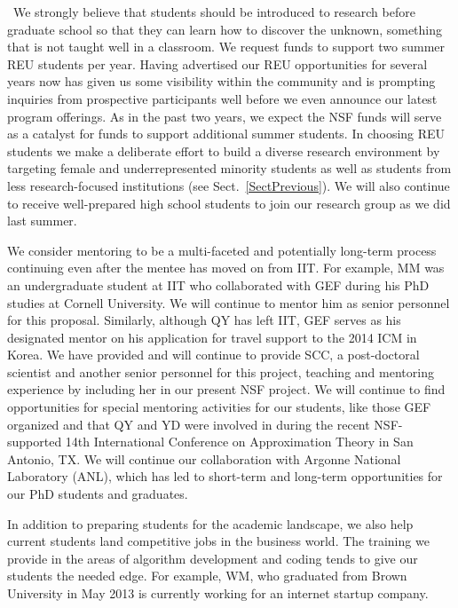\documentclass[11pt]{NSFamsart}
\begin{document}
\begin{description}[leftmargin=2.5ex]
\item[Providing Research Experiences for Undergraduates and High School Students]\ We \linebreak[4] strongly believe that students should be introduced to research before graduate school so that they can learn how to discover the unknown, something that is not taught well in a classroom. We request funds to support two summer REU students per year. Having advertised our REU opportunities for several years now has given us some visibility within the community and is prompting inquiries from prospective participants well before we even announce our latest program offerings. As in the past two years, we expect the NSF funds will serve as a catalyst for funds to support additional summer students. In choosing REU students we make a deliberate effort to build a diverse research environment by targeting female and underrepresented minority students as well as students from less research-focused institutions (see Sect.~\ref{SectPrevious}). We will also continue to receive well-prepared high school students to join our research group as we did last summer.

\item[Preparing Students for Academic Careers] We consider mentoring to be a multi-faceted and potentially long-term process continuing even after the mentee has moved on from IIT.  For example, MM was an undergraduate student at IIT who collaborated with GEF during his PhD studies at Cornell University.  We will continue to mentor him as senior personnel for this proposal. Similarly, although QY has left IIT, GEF serves as his designated mentor on his application for travel support to the 2014 ICM in Korea. We have provided and will continue to provide SCC, a post-doctoral scientist and another senior personnel for this project, teaching and mentoring experience by including her in our present NSF project.  We will continue to find opportunities for special mentoring activities for our students, like those GEF organized and that QY and YD were involved in during the recent NSF-supported 14th International Conference on Approximation Theory in San Antonio, TX.  We  will continue our collaboration with Argonne National Laboratory (ANL), which has led to short-term and long-term opportunities for our PhD students and graduates.

\item[Preparing Students for Industry Careers]
In addition to preparing students for the academic landscape, we also help current students land competitive jobs in the business world. The training we provide in the areas of algorithm development and coding tends to give our students the needed edge. For example, WM, who graduated from Brown University in May 2013 is currently working for an internet startup company.


\end{description}
\end{document}
